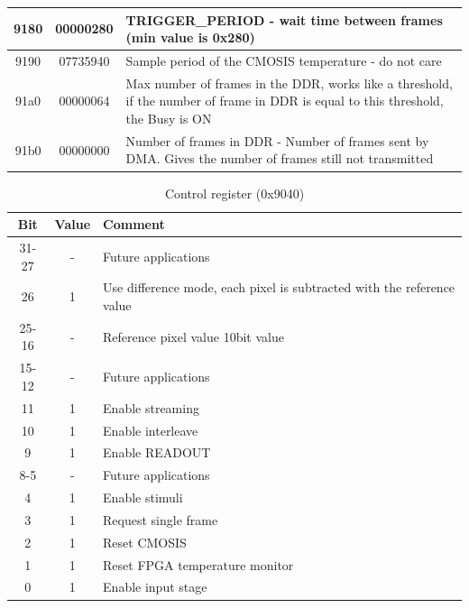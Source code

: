 \begin{table}[p]
\begin{center}
\begin{tabular}{|c| c|p{10cm}|}
\hline
9180 & 00000280 & TRIGGER\_PERIOD - wait time between frames (min value is 0x280) \\
\hline
9190 & 07735940 & Sample period of the CMOSIS temperature - do not care\\
\hline
91a0 & 00000064 & Max number of frames in the DDR, works like a threshold, if the number of frame in DDR is equal to this threshold, the Busy is ON	\\
\hline
91b0 & 00000000 & Number of frames in DDR - Number of frames sent by DMA. Gives the number of frames still not transmitted\\
\hline
\end{tabular}
\end{center}
\end{table}




\begin{table}[p]
\caption{\label{Control} Control register (0x9040)}
\begin{center}
\begin{tabular}{|c|c|p{10cm}|}
\hline
Bit				& Value 		& Comment \\
\hline
31-27 				& -			&  Future applications \\
\hline
26				& 1		& Use difference mode, each pixel is subtracted with the reference value  \\
\hline
25-16				& -			& Reference pixel value 10bit value \\
\hline
15-12				& -	& Future applications \\
\hline
11				& 1			& Enable streaming\\
\hline
10				& 1	& Enable interleave \\
\hline
9				& 1	& Enable READOUT \\
\hline
8-5				& -	& Future applications \\
\hline
4				& 1		& Enable stimuli \\
\hline
3				& 1		& Request single frame \\
\hline
2				& 1		& Reset CMOSIS \\
\hline
1				& 1		& Reset FPGA temperature monitor \\
\hline
0				& 1		& Enable input stage \\

\hline
\end{tabular}
\end{center}
\end{table}




